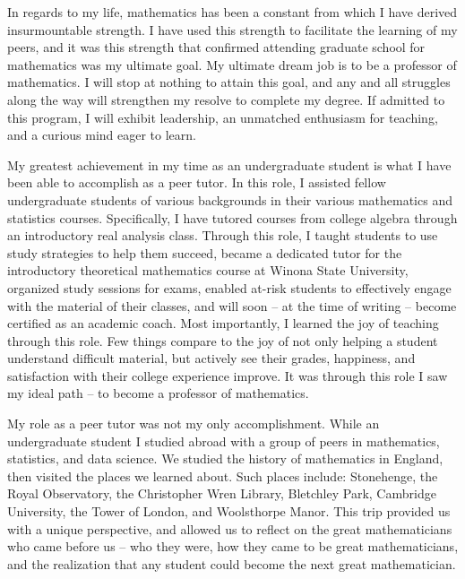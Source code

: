 \documentclass{article}
\begin{document}
\par{In regards to my life, mathematics has been a constant from which I have derived insurmountable strength. I have used this strength to facilitate the learning of my peers, and it was this strength that confirmed attending graduate school for mathematics was my ultimate goal. My ultimate dream job is to be a professor of mathematics. I will stop at nothing to attain this goal, and any and all struggles along the way will strengthen my resolve to complete my degree. If admitted to this program, I will exhibit leadership, an unmatched enthusiasm for teaching, and a curious mind eager to learn.}

\par{My greatest achievement in my time as an undergraduate student is what I have been able to accomplish as a peer tutor. In this role, I assisted fellow undergraduate students of various backgrounds in their various mathematics and statistics courses. Specifically, I have tutored courses from college algebra through an introductory real analysis class. Through this role, I taught students to use study strategies to help them succeed, became a dedicated tutor for the introductory theoretical mathematics course at Winona State University, organized study sessions for exams, enabled at-risk students to effectively engage with the material of their classes, and will soon -- at the time of writing -- become certified as an academic coach. Most importantly, I learned the joy of teaching through this role. Few things compare to the joy of not only helping a student understand difficult material, but actively see their grades, happiness, and satisfaction with their college experience improve. It was through this role I saw my ideal path -- to become a professor of mathematics.}

\par{My role as a peer tutor was not my only accomplishment. While an undergraduate student I studied abroad with a group of peers in mathematics, statistics, and data science. We studied the history of mathematics in England, then visited the places we learned about. Such places include: Stonehenge, the Royal Observatory, the Christopher Wren Library, Bletchley Park, Cambridge University, the Tower of London, and Woolsthorpe Manor. This trip provided us with a unique perspective, and allowed us to reflect on the great mathematicians who came before us -- who they were, how they came to be great mathematicians, and the realization that any student could become the next great mathematician.}
\end{document}
